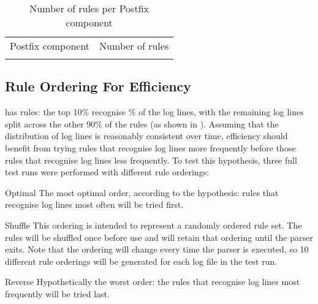 


\begin{table}[thbp]
    \caption{Number of rules per Postfix component}
    \empty{}\label{Number of rules per Postfix component}
    \centering{}
    \begin{tabular}{lr}
        \tabletopline{}%
        Postfix component & Number of rules \\
        \tablemiddleline{}%
        
        \tablebottomline{}%
    \end{tabular}
\end{table}

\FloatBarrier{}

\subsection{Rule Ordering For Efficiency}

\label{rule ordering for efficiency}

\parsername{} has \numberOFrules{} rules: the top 10\% recognise
\% of the log lines, with the remaining
log lines split across the other 90\% of the rules (as shown in
).  Assuming that the distribution of log lines
is reasonably consistent over time, \parsernames{} efficiency should
benefit from trying rules that recognise log lines more frequently before
those rules that recognise log lines less frequently.  To test this
hypothesis, three full test runs were performed with different rule
orderings:

\begin{eqlist}

    \item [Optimal]  The most optimal order, according to the hypothesis:
        rules that recognise log lines most often will be tried first.

    \item [Shuffle] This ordering is intended to represent a randomly
        ordered rule set.  The rules will be shuffled once before use and
        will retain that ordering until the parser exits.  Note that the
        ordering will change every time the parser is executed, so 10
        different rule orderings will be generated for each log file in the
        test run.

    \item [Reverse] Hypothetically the worst order: the rules that
        recognise log lines most frequently will be tried last.

\end{eqlist}


